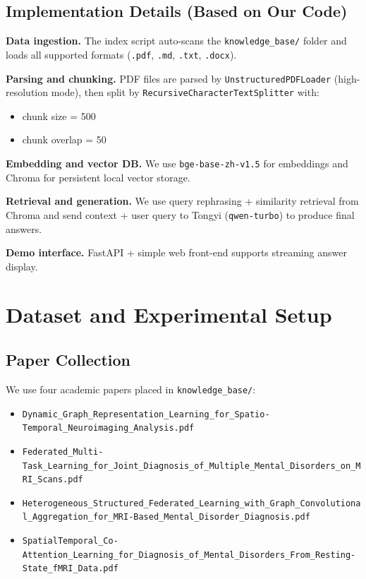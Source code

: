 \documentclass[11pt,a4paper]{article}
\begin{document}
\subsection{Implementation Details (Based on Our Code)}
\textbf{Data ingestion.}
The index script auto-scans the \texttt{knowledge\_base/} folder and loads all supported formats (\texttt{.pdf}, \texttt{.md}, \texttt{.txt}, \texttt{.docx}).

\textbf{Parsing and chunking.}
PDF files are parsed by \texttt{UnstructuredPDFLoader} (high-resolution mode), then split by \texttt{RecursiveCharacterTextSplitter} with:
\begin{itemize}[leftmargin=1.4em]
  \item chunk size = 500
  \item chunk overlap = 50
\end{itemize}

\textbf{Embedding and vector DB.}
We use \texttt{bge-base-zh-v1.5} for embeddings and Chroma for persistent local vector storage.

\textbf{Retrieval and generation.}
We use query rephrasing + similarity retrieval from Chroma and send context + user query to Tongyi (\texttt{qwen-turbo}) to produce final answers.

\textbf{Demo interface.}
FastAPI + simple web front-end supports streaming answer display.

\section{Dataset and Experimental Setup}
\subsection{Paper Collection}
We use four academic papers placed in \texttt{knowledge\_base/}:
\begin{itemize}[leftmargin=1.4em]
  \item \texttt{Dynamic\_Graph\_Representation\_Learning\_for\_Spatio-Temporal\_Neuroimaging\_Analysis.pdf}
  \item \texttt{Federated\_Multi-Task\_Learning\_for\_Joint\_Diagnosis\_of\_Multiple\_Mental\_Disorders\_on\_MRI\_Scans.pdf}
  \item \texttt{Heterogeneous\_Structured\_Federated\_Learning\_with\_Graph\_Convolutional\_Aggregation\_for\_MRI-Based\_Mental\_Disorder\_Diagnosis.pdf}
  \item \texttt{SpatialTemporal\_Co-Attention\_Learning\_for\_Diagnosis\_of\_Mental\_Disorders\_From\_Resting-State\_fMRI\_Data.pdf}
\end{itemize}
\end{document}

